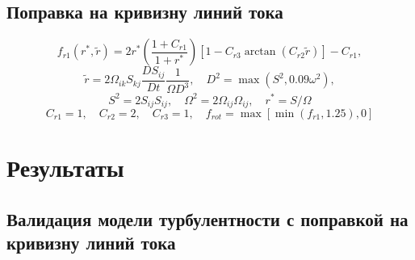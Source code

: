 \documentclass[pdftex,a4paper,12pt]{article}
\begin{document}
	\subsection{Поправка на кривизну линий тока}
		\begin{equation}
				f_{r1}(r^*,\tilde{r}) = 2r^*\left( \frac{1+C_{r1}}{1+ r^*} \right)\left[ 1-C_{r3}\arctan{(C_{r2}\tilde{r})} \right] - C_{r1},
		\end{equation}
		\begin{equation}
				\tilde{r} = 2\Omega_{ik}S_{kj}\frac{DS_{ij}}{Dt}\frac{1}{\Omega D^3}, \quad D^2 = \max(S^2, 0.09 \omega^2),
		\end{equation}
		$$
				S^2 = 2 S_{ij}S_{ij}, \quad \Omega^2 = 2 \Omega_{ij} \Omega_{ij}, \quad r^* = S/\Omega
		$$
		$$
				C_{r1} = 1, \quad C_{r2} = 2, \quad C_{r3} = 1, \quad f_{rot} = \max[\min(f_{r1},1.25),0]
		$$
\newpage
\section{Результаты}
\subsection{Валидация модели турбулентности с поправкой на кривизну линий тока}
\newpage
\end{document}
